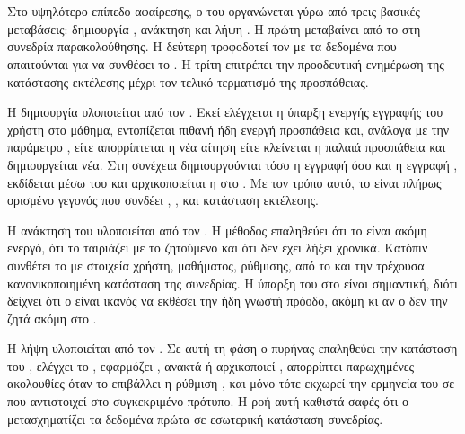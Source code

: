 \section{}
\label{sec:top_level_runtime_architecture}

Στο υψηλότερο επίπεδο αφαίρεσης, ο  του  οργανώνεται γύρω από τρεις βασικές μεταβάσεις: δημιουργία , ανάκτηση  και λήψη . Η πρώτη μεταβαίνει από το  στη συνεδρία παρακολούθησης. Η δεύτερη τροφοδοτεί τον  με τα δεδομένα που απαιτούνται για να συνθέσει το . Η τρίτη επιτρέπει την προοδευτική ενημέρωση της κατάστασης εκτέλεσης μέχρι τον τελικό τερματισμό της προσπάθειας.

Η δημιουργία  υλοποιείται από τον \texttt{}. Εκεί ελέγχεται η ύπαρξη ενεργής εγγραφής του χρήστη στο μάθημα, εντοπίζεται πιθανή ήδη ενεργή προσπάθεια και, ανάλογα με την παράμετρο \texttt{}, είτε απορρίπτεται η νέα αίτηση είτε κλείνεται η παλαιά προσπάθεια και δημιουργείται νέα. Στη συνέχεια δημιουργούνται τόσο η εγγραφή  όσο και η εγγραφή , εκδίδεται  μέσω του \texttt{} και αρχικοποιείται η  στο \texttt{}. Με τον τρόπο αυτό, το  είναι πλήρως ορισμένο  γεγονός που συνδέει , ,  και κατάσταση εκτέλεσης.

Η ανάκτηση του  υλοποιείται από τον \texttt{}. Η μέθοδος \texttt{} επαληθεύει ότι το  είναι ακόμη ενεργό, ότι το  ταιριάζει με το ζητούμενο  και ότι δεν έχει λήξει χρονικά. Κατόπιν συνθέτει το \texttt{} με στοιχεία χρήστη, μαθήματος,  ρύθμισης,  από το  και την τρέχουσα κανονικοποιημένη κατάσταση της συνεδρίας. Η ύπαρξη του \texttt{} στο  είναι σημαντική, διότι δείχνει ότι ο  είναι ικανός να εκθέσει την ήδη γνωστή πρόοδο, ακόμη κι αν ο  δεν την ζητά ακόμη στο .

Η λήψη  υλοποιείται από τον \texttt{}. Σε αυτή τη φάση ο πυρήνας επαληθεύει την κατάσταση του , ελέγχει το , εφαρμόζει , ανακτά ή αρχικοποιεί , απορρίπτει παρωχημένες ακολουθίες  όταν το επιβάλλει η ρύθμιση \texttt{}, και μόνο τότε εκχωρεί την ερμηνεία του  σε  που αντιστοιχεί στο συγκεκριμένο πρότυπο. Η ροή αυτή καθιστά σαφές ότι ο  μετασχηματίζει τα δεδομένα πρώτα σε εσωτερική κατάσταση συνεδρίας.

